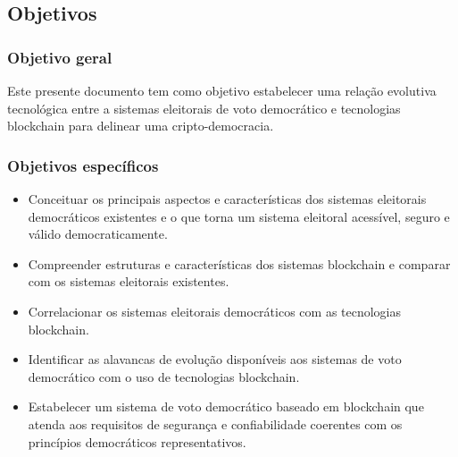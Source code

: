 \subsection{Objetivos}
\subsubsection{Objetivo geral}
Este presente documento tem como objetivo estabelecer uma relação evolutiva 
tecnológica entre a sistemas eleitorais de voto democrático e tecnologias blockchain
para delinear uma cripto-democracia.
\subsubsection{Objetivos específicos}
\begin{itemize}
  \item Conceituar os principais aspectos e características dos sistemas eleitorais democráticos
  existentes e o que torna um sistema eleitoral acessível, seguro e válido democraticamente.
  \item Compreender estruturas e características dos sistemas blockchain e comparar com os sistemas
  eleitorais existentes.
  \item Correlacionar os sistemas eleitorais democráticos com as tecnologias blockchain.
  \item Identificar as alavancas de evolução disponíveis aos sistemas de voto democrático 
  com o uso de tecnologias blockchain.
  \item Estabelecer um sistema de voto democrático baseado em blockchain que atenda
  aos requisitos de segurança e confiabilidade coerentes com os princípios 
  democráticos representativos.
\end{itemize}
\clearpage

